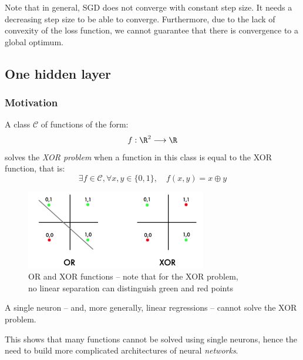 \documentclass[toc, titlepaged]{../cs-classes/cs-classes}
\begin{document}
Note that in general, SGD does not converge with constant step size. It needs a decreasing step size to be able to converge. Furthermore, due to the lack of convexity of the loss function, we cannot guarantee that there is convergence to a global optimum.

\subsection{One hidden layer}
\subsubsection{Motivation}
\begin{definition}
    A class $\mathcal{C}$  of functions of the form:
    \begin{equation*}
        f:\R^2\longrightarrow\R
    \end{equation*}
    solves the \emph{\textnormal{XOR} problem} when a function in this class is equal to the XOR function, that is:
    \begin{equation*}
        \exists f\in\mathcal{C}, \forall x, y\in\{0, 1\}, \quad f(x, y) = x \oplus y
    \end{equation*}
\end{definition}

\begin{figure}[H]
    \captionsetup{justification=centering}
    \centering
    \includegraphics[width=0.7\textwidth]{images/xor-problem.png}
    \caption{OR and XOR functions -- note that for the XOR problem,\\ no linear separation can distinguish green and red points}
\end{figure}

\begin{property}
    A single neuron -- and, more generally, linear regressions -- cannot solve the XOR problem.
\end{property}

This shows that many  functions cannot be solved using single neurons, hence the need to build more complicated architectures of neural \emph{networks}.
\end{document}
